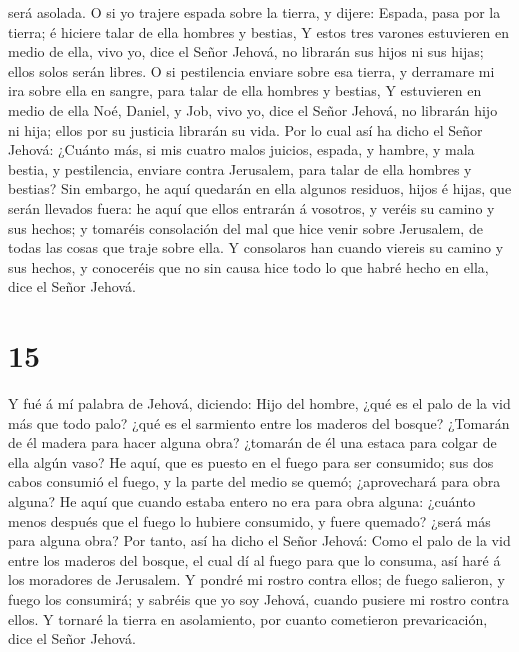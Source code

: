 será asolada.  O si yo trajere espada sobre la tierra, y
dijere: Espada, pasa por la tierra; é hiciere talar de ella hombres y
bestias,  Y estos tres varones estuvieren en medio de
ella, vivo yo, dice el Señor Jehová, no librarán sus hijos ni sus hijas;
ellos solos serán libres.  O si pestilencia enviare sobre
esa tierra, y derramare mi ira sobre ella en sangre, para talar de ella
hombres y bestias,  Y estuvieren en medio de ella Noé,
Daniel, y Job, vivo yo, dice el Señor Jehová, no librarán hijo ni hija;
ellos por su justicia librarán su vida.  Por lo cual así
ha dicho el Señor Jehová: ¿Cuánto más, si mis cuatro malos juicios,
espada, y hambre, y mala bestia, y pestilencia, enviare contra
Jerusalem, para talar de ella hombres y bestias?  Sin
embargo, he aquí quedarán en ella algunos residuos, hijos é hijas, que
serán llevados fuera: he aquí que ellos entrarán á vosotros, y veréis su
camino y sus hechos; y tomaréis consolación del mal que hice venir sobre
Jerusalem, de todas las cosas que traje sobre ella.  Y
consolaros han cuando viereis su camino y sus hechos, y conoceréis que
no sin causa hice todo lo que habré hecho en ella, dice el Señor Jehová.

\hypertarget{section-14}{%
\section{15}\label{section-14}}

 Y fué á mí palabra de Jehová, diciendo: 
Hijo del hombre, ¿qué es el palo de la vid más que todo palo? ¿qué es el
sarmiento entre los maderos del bosque?  ¿Tomarán de él
madera para hacer alguna obra? ¿tomarán de él una estaca para colgar de
ella algún vaso?  He aquí, que es puesto en el fuego para
ser consumido; sus dos cabos consumió el fuego, y la parte del medio se
quemó; ¿aprovechará para obra alguna?  He aquí que cuando
estaba entero no era para obra alguna: ¿cuánto menos después que el
fuego lo hubiere consumido, y fuere quemado? ¿será más para alguna obra?
 Por tanto, así ha dicho el Señor Jehová: Como el palo de
la vid entre los maderos del bosque, el cual dí al fuego para que lo
consuma, así haré á los moradores de Jerusalem.  Y pondré
mi rostro contra ellos; de fuego salieron, y fuego los consumirá; y
sabréis que yo soy Jehová, cuando pusiere mi rostro contra ellos.
 Y tornaré la tierra en asolamiento, por cuanto cometieron
prevaricación, dice el Señor Jehová.

